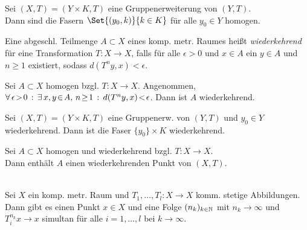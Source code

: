 \documentclass{cheat-sheet}
\begin{document}
\begin{bsp}
  Sei $(X, T) = (Y \!\times\! K, T)$ eine Gruppenerweiterung von $(Y, T)$. \\
  Dann sind die Fasern $\Set{(y_0, k)}{k \in K}$ für alle $y_0 \in Y$ homogen.
\end{bsp}

\begin{defn}
  Eine abgeschl. Teilmenge $A \subset X$ eines komp. metr. Raumes heißt \emph{wiederkehrend} für eine Transformation $T : X \to X$, falls für alle $\epsilon \!>\! 0$ und $x \!\in\! A$ ein $y \!\in\! A$ und $n \!\geq\! 1$ existiert, sodass $d(T^n y, x) \!<\! \epsilon$.
\end{defn}

\begin{lem}
  Sei $A \subset X$ homogen bzgl. $T : X \to X$.
  Angenommen, $\fa{\epsilon \!>\! 0} \ex{x, y \!\in\! A, \, n \!\geq\! 1} d(T^n y, x) \!<\! \epsilon$. 
  Dann ist $A$ wiederkehrend.
\end{lem}

\begin{bsp}
  Sei $(X, T) \!=\! (Y \!\times\! K, T)$ eine Gruppenerw. von $(Y, T)$ und $y_0 \in Y$ wiederkehrend.
  Dann ist die Faser $\{ y_0 \} \times K$ wiederkehrend.
\end{bsp}

\begin{lem}
  Sei $A \subset X$ homogen und wiederkehrend bzgl. $T : X \to X$. \\
  Dann enthält $A$ einen wiederkehrenden Punkt von $(X, T)$.
\end{lem}




\begin{thm}\mbox{}\\
  Sei $X$ ein komp. metr. Raum und $T_1, \ldots, T_l : X \to X$ komm. stetige Abbildungen.
  Dann gibt es einen Punkt $x \!\in\! X$ und eine Folge $(n_k)_{k \in \mathbb{N}}$ mit $n_k \to \infty$ und $T_i^{n_k} x \to x$ simultan für alle $i = 1, \ldots, l$ bei $k \to \infty$.
\end{thm}
\end{document}
